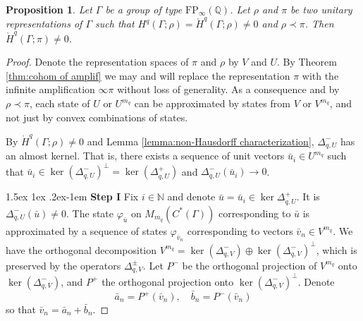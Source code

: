 \documentclass[12pt,reqno]{amsart}
\makeatletter
\newcommand{\N}{\mathbb{N}}
\newtheorem{proposition}[theorem]{Proposition}
\theoremstyle{definition}
\newcommand{\torH}{\mathring{H}}
\renewcommand\paragraph{\@startsection{paragraph}{4}{\z@}%
  {1.5ex \@plus 1ex \@minus .2ex}{-1em}%
  {\normalfont\normalsize\bfseries}}
\makeatother
\begin{document}
\begin{proposition}\label{prop:non-red is topological finit prop}
    Let $\Gamma$ be a group of type $\mathrm{FP}_\infty(\mathbb{Q})$. Let $\rho$ and $\pi$ be two unitary representations of $\Gamma$ such that $H^q(\Gamma;\rho)=\torH^q(\Gamma;\rho)\ne 0$ and $\rho \prec \pi$. Then $\torH^q(\Gamma;\pi) \ne 0$.
\end{proposition}

\begin{proof}
    Denote the representation spaces of $\pi$ and $\rho$ by $V$ and $U$. By Theorem \ref{thm:cohom of amplif} we may and will replace the representation $\pi$ with the infinite amplification $\infty \pi$ without loss of generality. 
    As a consequence and by $\rho \prec \pi$, each state of $U$ or $U^{m_q}$ can be approximated by states from $V$ or $V^{m_q}$, and not just by convex combinations of states. 
    
    By $\torH^q(\Gamma;\rho)\ne 0$ and Lemma \ref{lemma:non-Hausdorff characterization}, $\Delta_{q,U}^-$ has an almost kernel. That is, there exists a sequence of unit vectors $\bar{u}_i \in U^{m_q}$ such that $\bar{u}_i \in  \ker(\Delta_{q,U}^-)^\perp = \ker(\Delta_{q,U}^+)$ and $\Delta_{q,U}^-(\bar{u}_i) \rightarrow 0$.

   \paragraph{\textbf{Step I}}
   Fix $i\in\N$ and denote $\bar{u}=\bar{u}_i\in \ker\Delta_{q,U}^+$. It is $\Delta_{q,U}^-(\bar{u}) \ne 0$.  The state $\varphi_{\bar{u}}$ on $M_{m_q}(C^*(\Gamma))$ corresponding to $\bar{u}$ is approximated by a sequence of states $\varphi_{\bar{v}_n}$ corresponding to vectors $\bar{v}_n \in V^{m_q}$. We have the orthogonal decomposition $V^{m_q}=\ker(\Delta_{q,V}^-) \oplus \ker(\Delta_{q,V}^-)^{\perp}$, which is preserved by the operators $\Delta_{q, V}^\pm$. Let $P^-$ be the orthogonal projection of $V^{m_q}$ onto $\ker(\Delta_{q,V}^-)$, and $P^+$ the orthogonal projection onto $\ker(\Delta_{q,V}^-)^{\perp}$. Denote
    $$\bar{a}_n=P^+(\bar{v}_n), \quad \bar{b}_n=P^-(\bar{v}_n)$$
    so that $\bar{v}_n=\bar{a}_n+\bar{b}_n$.

\end{proof}
\end{document}
